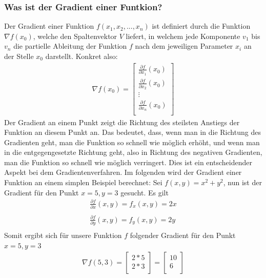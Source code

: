 \subsubsection{Was ist der Gradient einer Funtkion?}\label{subsec:gradientenverfahren:was_ist_gradient}
  Der Gradient einer Funktion $f(x_{1}, x_{2}, ... , x_{n})$ ist definiert durch die Funktion $\nabla f(x_{0})$, welche den Spaltenvektor $V$ liefert, in welchem jede Komponente $v_1$ bis $v_n$ die partielle Ableitung der Funktion $f$ nach dem jeweiligen Parameter 
  $x_{i}$ an der Stelle $x_0$ darstellt. Konkret also: 
  \renewcommand{\arraystretch}{1.5}
  \begin{align*}
    \nabla f(x_0) =\begin{bmatrix}
          \frac{\partial f}{\partial x_{1}}(x_{0}) \\
          \frac{\partial f}{\partial x_{2}}(x_{0}) \\
           \vdots \\
           \frac{\partial f}{\partial x_{n}}(x_{0}) \\
         \end{bmatrix}
  \end{align*}
  \renewcommand{\arraystretch}{1}
  Der Gradient an einem Punkt zeigt die Richtung des steilsten Anstiegs der Funktion an diesem Punkt an. Das bedeutet, dass,
  wenn man in die Richtung des Gradienten geht, man die Funktion so schnell wie möglich erhöht, und wenn man in die entgegengesetzte Richtung geht,
  also in Richtung des negativen Gradienten, man die Funktion so schnell wie möglich verringert. Dies ist ein entscheidender Aspekt bei dem Gradientenverfahren.
  \bigbreak\noindent
  Im folgenden wird der Gradient einer Funktion an einem simplen Beispiel berechnet: 
  \bigbreak\noindent
  Sei $f(x, y) = x^2 + y^2$, nun ist der Gradient für den Punkt $x = 5, y = 3$ gesucht. Es gilt
  \begin{align*}
    \frac{\partial f}{\partial x}(x,y) = f_{x}(x,y) = 2x\\
    \\
    \frac{\partial f}{\partial y}(x,y) = f_{y}(x,y) = 2y\\
  \end{align*}
  Somit ergibt sich für unsere Funktion $f$ folgender Gradient für den Punkt $x = 5, y = 3$ 
  \begin{align*}
    \nabla f(5, 3) = \begin{bmatrix}
      2 * 5\\
      2 * 3\\
    \end{bmatrix} = \begin{bmatrix}
      10\\
      6\\
    \end{bmatrix}
  \end{align*}

